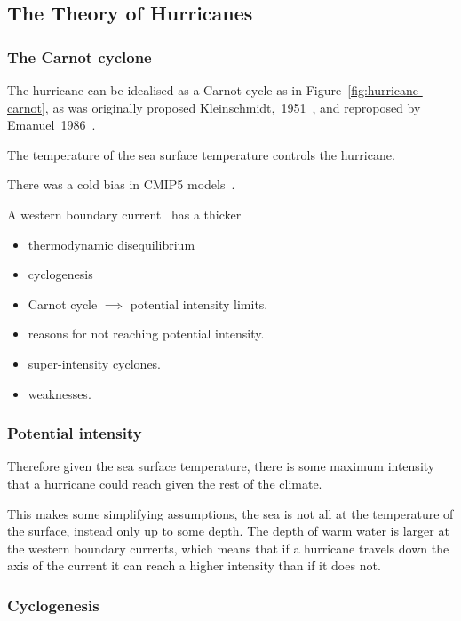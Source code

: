 
\subsection{The Theory of Hurricanes}
\label{sec:hurr-theory}
\subsubsection{The Carnot cyclone}
\label{sec:carnot}

The hurricane can be idealised as a Carnot cycle as in Figure~\ref{fig:hurricane-carnot},
as was originally proposed Kleinschmidt,~1951~\cite{kleinschmidt1951grundlagen},
and reproposed by Emanuel~1986~\cite{lilly1985steady, emanuel1986air,emanuel1987dependence}.
\cite{emanuel1991theory, emanuel2018progress}



The temperature of the sea surface temperature controls the hurricane.

There was a cold bias in CMIP5 models~\cite{camargo2013global}.

A western boundary current~\cite{hogg1995western} has a thicker

\begin{itemize}
\item thermodynamic disequilibrium
\item cyclogenesis
\item Carnot cycle $\implies$ potential intensity limits.
\item reasons for not reaching potential intensity.
\item super-intensity cyclones.
\item weaknesses.
\end{itemize}

\subsubsection{Potential intensity}
\label{sec:potential_intensity}

\cite{bister2002low}
Therefore given the sea surface temperature, there is some maximum intensity
that a hurricane could reach given the rest of the climate.


\cite{bister1996development,bister1998dissipative, bister2002low}

This makes some simplifying assumptions, the sea is not all at the temperature
of the surface, instead only up to some depth. The depth of warm water
is larger at the western boundary currents, which means that if a hurricane
travels down the axis of the current it can reach a higher intensity than
if it does not.

\subsubsection{Cyclogenesis}

